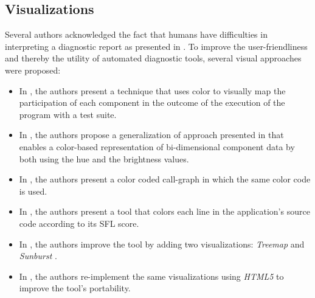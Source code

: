\subsection*{Visualizations}
Several authors acknowledged the fact that humans have difficulties in
interpreting a diagnostic report as presented in
 \citep{Jones04}.
%
To improve the user-friendliness and thereby the utility of automated
diagnostic tools, several visual approaches were proposed:
\begin{itemize}[nolistsep]
\item In \citep{Jones02,Jones05}, the authors present a technique that
  uses color to visually map the participation of each component in
  the outcome of the execution of the program with a test suite.
\item In \citep{Orso04}, the authors propose a generalization of
  approach presented in \citep{Jones02} that enables a color-based
  representation of bi-dimensional component data by both using the
  hue and the brightness values.
\item In \citep{Bouillon07}, the authors present a color coded
  call-graph in which the same color code is used.
\item In \citep{Janssen09}, the authors present a tool that colors
  each line in the application's source code according to its
  \ac{SFL} score.
\item In \citep{Campos12}, the authors improve the tool by adding
  two visualizations: \emph{Treemap} and \emph{Sunburst}
  \citep{Riboira11}.
\item In \citep{Gouveia13}, the authors re-implement the same
  visualizations using \emph{HTML5} to improve the tool's portability.
\end{itemize}
